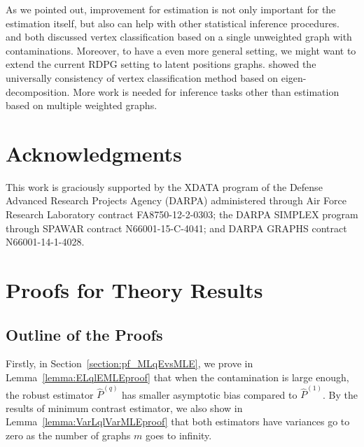 \documentclass[a4paper]{article}
\renewcommand{\hat}{\widehat}
\begin{document}
As we pointed out, improvement for estimation is not only important for the estimation itself, but also can help with other statistical inference procedures. \citet{priebe2015statistical} and \citet{chen2016robust} both discussed vertex classification based on a single unweighted graph with contaminations.
Moreover, to have a even more general setting, we might want to extend the current RDPG setting to latent positions graphs. \citet{tang2013universally} showed the universally consistency of vertex classification method based on eigen-decomposition.
More work is needed for inference tasks other than estimation based on multiple weighted graphs.


\section*{Acknowledgments}
This work is graciously supported by the XDATA program of the Defense
Advanced Research Projects Agency (DARPA) administered through Air
Force Research Laboratory contract FA8750-12-2-0303; the DARPA SIMPLEX
program through SPAWAR contract N66001-15-C-4041; and DARPA GRAPHS
contract N66001-14-1-4028.


{}




\appendix


\section{Proofs for Theory Results}

\subsection{Outline of the Proofs}

Firstly, in Section~\ref{section:pf_MLqEvsMLE}, we prove in Lemma~\ref{lemma:ELqlEMLEproof} that when the contamination is large enough, the robust estimator $\hat{P}^{(q)}$ has smaller asymptotic bias compared to $\hat{P}^{(1)}$. By the results of minimum contrast estimator, we also show in Lemma~\ref{lemma:VarLqlVarMLEproof} that both estimators have variances go to zero as the number of graphs $m$ goes to infinity.
\end{document}
